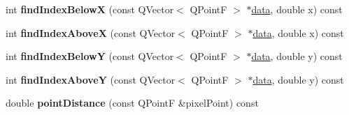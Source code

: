 \begin{DoxyCompactItemize}
\item 
\hypertarget{classQCPGraph_a6f4e9461d5925be9228fc4760249a04f}{}int {\bfseries find\+Index\+Below\+X} (const Q\+Vector$<$ Q\+Point\+F $>$ $\ast$\hyperlink{classQCPGraph_a2f58436df4f86a2792b776a21642b3d9}{data}, double x) const \label{classQCPGraph_a6f4e9461d5925be9228fc4760249a04f}

\item 
\hypertarget{classQCPGraph_abab2a75b5e63630432bdd1f3b57f07fa}{}int {\bfseries find\+Index\+Above\+X} (const Q\+Vector$<$ Q\+Point\+F $>$ $\ast$\hyperlink{classQCPGraph_a2f58436df4f86a2792b776a21642b3d9}{data}, double x) const \label{classQCPGraph_abab2a75b5e63630432bdd1f3b57f07fa}

\item 
\hypertarget{classQCPGraph_a6c4d556de3d1e02f548401001f72c6ff}{}int {\bfseries find\+Index\+Below\+Y} (const Q\+Vector$<$ Q\+Point\+F $>$ $\ast$\hyperlink{classQCPGraph_a2f58436df4f86a2792b776a21642b3d9}{data}, double y) const \label{classQCPGraph_a6c4d556de3d1e02f548401001f72c6ff}

\item 
\hypertarget{classQCPGraph_adf50243f1df203883a2187089734bfcb}{}int {\bfseries find\+Index\+Above\+Y} (const Q\+Vector$<$ Q\+Point\+F $>$ $\ast$\hyperlink{classQCPGraph_a2f58436df4f86a2792b776a21642b3d9}{data}, double y) const \label{classQCPGraph_adf50243f1df203883a2187089734bfcb}

\item 
\hypertarget{classQCPGraph_af93762a12a481a7edb4b3dd9e330dff1}{}double {\bfseries point\+Distance} (const Q\+Point\+F \&pixel\+Point) const \label{classQCPGraph_af93762a12a481a7edb4b3dd9e330dff1}

\end{DoxyCompactItemize}
